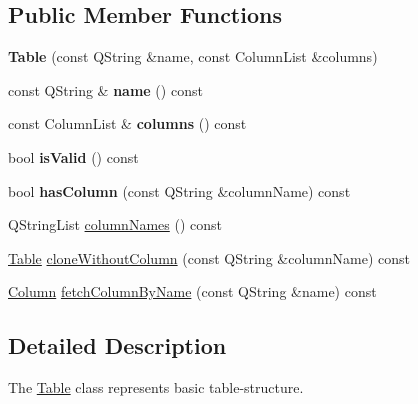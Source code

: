 \subsection*{Public Member Functions}
\begin{DoxyCompactItemize}
\item 
\mbox{\label{class_q_sql_migrator_1_1_structure_1_1_table_af082e6f451ccd29c9e6802edc2b8679f}} 
{\bfseries Table} (const Q\+String \&name, const Column\+List \&columns)
\item 
\mbox{\label{class_q_sql_migrator_1_1_structure_1_1_table_a0a10ebfe069af02a399e9ee6428b59a4}} 
const Q\+String \& {\bfseries name} () const
\item 
\mbox{\label{class_q_sql_migrator_1_1_structure_1_1_table_a06429875e52f9f9f34caccaccd0af96f}} 
const Column\+List \& {\bfseries columns} () const
\item 
\mbox{\label{class_q_sql_migrator_1_1_structure_1_1_table_a6be4aaf4447939be1fb346e4ff602bf5}} 
bool {\bfseries is\+Valid} () const
\item 
\mbox{\label{class_q_sql_migrator_1_1_structure_1_1_table_aa267b06b340116416a790d6f511f6e44}} 
bool {\bfseries has\+Column} (const Q\+String \&column\+Name) const
\item 
Q\+String\+List \hyperlink{class_q_sql_migrator_1_1_structure_1_1_table_a0bba07abafd6027dc62949d45b7f3886}{column\+Names} () const
\item 
\hyperlink{class_q_sql_migrator_1_1_structure_1_1_table}{Table} \hyperlink{class_q_sql_migrator_1_1_structure_1_1_table_a71965f3d679b32caeb1669afdf68d4da}{clone\+Without\+Column} (const Q\+String \&column\+Name) const
\item 
\hyperlink{class_q_sql_migrator_1_1_structure_1_1_column}{Column} \hyperlink{class_q_sql_migrator_1_1_structure_1_1_table_a19734a5c9414f7e8c90591349ad607c3}{fetch\+Column\+By\+Name} (const Q\+String \&name) const
\end{DoxyCompactItemize}


\subsection{Detailed Description}
The \hyperlink{class_q_sql_migrator_1_1_structure_1_1_table}{Table} class represents basic table-\/structure. 

